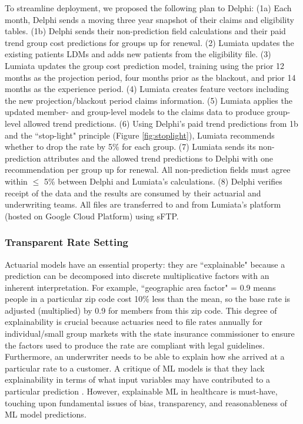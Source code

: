 \documentclass[letterpaper]{article} %
\begin{document}
To streamline deployment, we proposed the following plan to Delphi:
(1a) Each month, Delphi sends a moving three year snapshot of their claims and eligibility tables.
(1b) Delphi sends their non-prediction field calculations and their paid trend group cost predictions for groups up for renewal.
(2) Lumiata updates the existing patients LDMs and adds new patients from the eligibility file.
(3) Lumiata updates the group cost prediction model, training using the prior 12 months as the projection period, four months prior as the blackout, and prior 14 months as the experience period.
(4) Lumiata creates feature vectors including the new projection/blackout period claims information.
(5) Lumiata applies the updated member- and group-level models to the claims data to produce group-level allowed trend predictions.
(6) Using Delphi's paid trend predictions from 1b and the ``stop-light" principle (Figure \ref{fig:stoplight}), Lumiata recommends whether to drop the rate by 5\% for each group.
(7) Lumiata sends its non-prediction attributes and the allowed trend predictions to Delphi with one recommendation per group up for renewal. All non-prediction fields must agree within $\leq$ 5\% between Delphi and Lumiata's calculations.
(8) Delphi verifies receipt of the data and the results are consumed by their actuarial and underwriting teams.
All files are transferred to and from Lumiata's platform (hosted on Google Cloud Platform) using sFTP.

\subsubsection{Transparent Rate Setting}\label{sec:deployment}
Actuarial models have an essential property: they are ``explainable" because a prediction can be decomposed into discrete multiplicative factors with an inherent interpretation.  For example, ``geographic area factor" = 0.9 means people in a particular zip code cost 10\% less than the mean, so the base rate is adjusted (multiplied) by 0.9 for members from this zip code.  This degree of explainability is crucial because actuaries need to file rates annually for individual/small group markets with the state insurance commissioner to ensure the factors used to produce the rate are compliant with legal guidelines.  Furthermore, an underwriter needs to be able to explain how she arrived at a particular rate to a customer.
A critique of ML models is that they lack explainability in terms of what input variables may have contributed to a particular prediction \cite{xai}.  However, explainable ML in healthcare is must-have, touching upon fundamental issues of bias, transparency, and reasonableness of ML model predictions.
\end{document}
